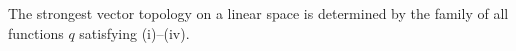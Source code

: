 The strongest vector topology on a linear space is determined by the family of all functions $q$ satisfying (i)--(iv).
